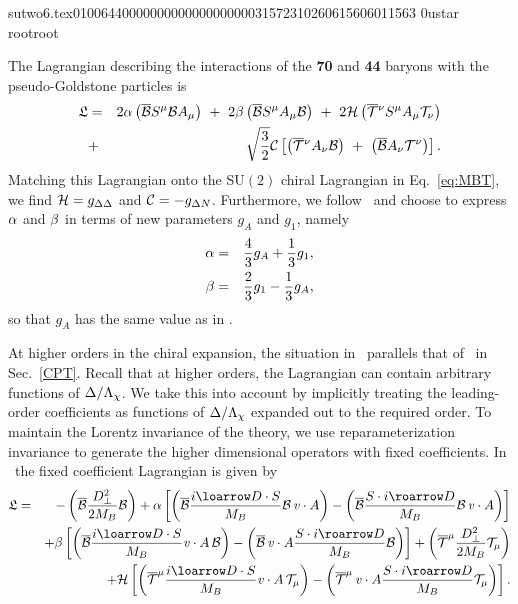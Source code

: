                                                                                                                                                                                                                                                                                       sutwo6.tex                                                                                          0100644 0000000 0000000 00000315723 10260615606 011563  0                                                                                                    ustar   root                            root                                                                                                                                                                                                                   \documentclass[prd,amssymb,amsmath,showpacs,nofootinbib,superscriptaddress]{revtex4}
\begin{document}
The Lagrangian describing the interactions of the {\bf 70} and {\bf 44}
baryons with the pseudo-Goldstone particles is 
\begin{eqnarray}
\mathfrak{L}  &=& 
    2\a\left(\ol{\c{B}} S^\mu \c{B} A_\mu \right)\ 
    +\ 2\beta \left(\ol{\c{B}} S^\mu A_\mu \c{B} \right)\ 
    +\ 2{\cal H} \left( \ol{\c{T}} {}^\nu S^\mu A_\mu \c{T}_\nu \right)
\notag \\
    &+& \sqrt{\frac{3}{2}}{\c{C}} \left[ \left( \ol{\c{T}}{}^\nu A_\nu \c{B}
      \right)\ 
    +\ \left( \ol{\c{B}} A_\nu \c{T}^\nu \right) \right]. 
\end{eqnarray} 
Matching this Lagrangian onto the SU$(2)$ chiral Lagrangian in Eq.~\eqref{eq:MBT}, we find
${\mathcal H} = g_{{\Delta} {\Delta}}$ and $\mathcal{C} = - g_{{\Delta} N}$. Furthermore, we follow~\cite{Beane:2002vq} 
and choose to express ${\alpha}$ and ${\beta}$ in terms of new parameters $g_A$ and $g_1$, namely
\begin{eqnarray}
{\alpha} &=& \frac{4}{3} g_A + \frac{1}{3} g_1,  \\
{\beta} &=& \frac{2}{3} g_1 - \frac{1}{3} g_A,
\end{eqnarray}
so that $g_A$ has the same value as in \CPT. 



At higher orders in the chiral expansion, the situation in \PQCPT\ parallels that of \CPT\ in Sec.~\ref{CPT}. 
Recall that at higher orders, the Lagrangian can contain arbitrary functions
of ${\Delta} / {\Lambda}_\chi$. We take this into account by implicitly treating 
the leading-order coefficients as functions of ${\Delta} / {\Lambda}_\chi$ expanded out 
to the required order. To maintain the Lorentz invariance of the theory, we use reparameterization invariance 
to generate the higher dimensional operators with fixed coefficients. 
In \PQCPT\ the fixed coefficient Lagrangian is given by
\begin{eqnarray}
\mathfrak{L} &=& 
- \left( \ol{\c{B}} \frac{D_\perp^2}{2 M_B} \c{B} \right)
+ \a \left[ \left( \ol{\c{B}}  \frac{i \loarrow D \cdot S}{M_B}
       \c{B} \, \vit \cdot A \right) - \left( \ol{\c{B}} \frac{S\cdot i \roarrow D}
       {M_B} \c{B} \, \vit \cdot A \right) \right] 
\notag \\
&&
+ \b \left[ \left( \ol{\c{B}}  \frac{i \loarrow D \cdot S}{M_B}
       \vit \cdot A \, \c{B} \right) - \left( \ol{\c{B}} \, \vit\cdot A \frac{S\cdot i \roarrow D}
       {M_B} \c{B} \right) \right] 
+ \left( \ol{\c{T}}^\mu \frac{D_\perp^2}{2 M_B} \c{T}_\mu \right)
\notag \\
&&  
+ \c{H} \left[ \left( \ol{\c{T}}^\mu \frac{i \loarrow D \cdot S}{M_B}
       \vit \cdot A \, \c{T}_\mu \right) - \left( \ol{\c{T}}^\mu \, \vit\cdot A \frac{S\cdot i \roarrow D}
       {M_B} \c{T}_\mu \right) \right] 
\label{eq:fixedPQ}
.\end{eqnarray}
\end{document}
